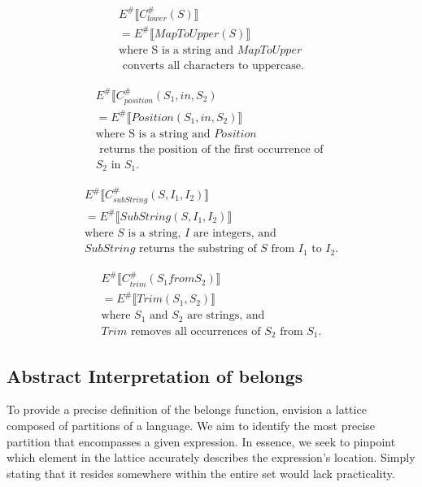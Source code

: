 \begin{align*}
    E^\# \llbracket C_{lower}^\# (S) \rrbracket \\
    = E^\# \llbracket MapToUpper (S) \rrbracket \\
    \text{where S is a string and } MapToUpper \\ 
    \text{ converts all characters to uppercase.}
\end{align*}

\begin{align*}
    E^\# \llbracket C_{position}^\# (S_1, in, S_2) \\
    = E^\# \llbracket Position(S_1, in, S_2) \rrbracket \\
    \text{where S is a string and } Position \\
    \text{ returns the position of the first occurrence of } \\
    S_2 \text{ in } S_1.
\end{align*}

\begin{align*}
    E^\# \llbracket C_{subString}^\# (S, I_1, I_2) \rrbracket \\
    = E^\# \llbracket SubString(S, I_1, I_2) \rrbracket \\
    \text{where } S \text{ is a string, } I \text{ are integers, and } \\
    SubString \text{ returns the substring of } S \text{ from } I_1 \text{ to } I_2.
\end{align*}

\begin{align*}
    E^\# \llbracket C_{trim}^\# (S_1 from S_2) \rrbracket \\
    = E^\# \llbracket Trim(S_1, S_2) \rrbracket \\
    \text{where } S_1 \text{ and } S_2 \text{ are strings, and }\\
    Trim \text{ removes all occurrences of } S_2 \text{ from } S_1.
\end{align*}

\subsection{Abstract Interpretation of belongs}
To provide a precise definition of the belongs function, envision a lattice composed of partitions of a language. We aim to identify the most precise partition that encompasses a given expression. In essence, we seek to pinpoint which element in the lattice accurately describes the expression's location. Simply stating that it resides somewhere within the entire set would lack practicality.

